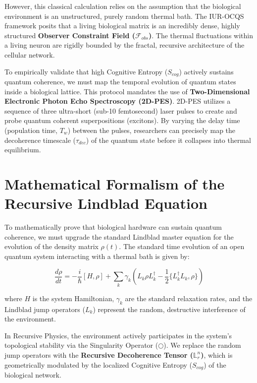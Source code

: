 \documentclass[12pt,openany]{book}
\begin{document}
However, this classical calculation relies on the assumption that the biological environment is an unstructured, purely random thermal bath. The IUR-OCQS framework posits that a living biological matrix is an incredibly dense, highly structured \textbf{Observer Constraint Field ($\mathcal{F}_{obs}$)}. The thermal fluctuations within a living neuron are rigidly bounded by the fractal, recursive architecture of the cellular network. 

To empirically validate that high Cognitive Entropy ($S_{cog}$) actively sustains quantum coherence, we must map the temporal evolution of quantum states inside a biological lattice. This protocol mandates the use of \textbf{Two-Dimensional Electronic Photon Echo Spectroscopy (2D-PES)}. 2D-PES utilizes a sequence of three ultra-short (sub-10 femtosecond) laser pulses to create and probe quantum coherent superpositions (excitons). By varying the delay time (population time, $T_w$) between the pulses, researchers can precisely map the decoherence timescale ($\tau_{dec}$) of the quantum state before it collapses into thermal equilibrium.

\section{Mathematical Formalism of the Recursive Lindblad Equation}
To mathematically prove that biological hardware can sustain quantum coherence, we must upgrade the standard Lindblad master equation for the evolution of the density matrix $\rho(t)$. The standard time evolution of an open quantum system interacting with a thermal bath is given by:

\begin{equation}
\frac{d\rho}{dt} = -\frac{i}{\hbar}[H, \rho] + \sum_k \gamma_k \left( L_k \rho L_k^\dagger - \frac{1}{2} \{L_k^\dagger L_k, \rho\} \right)
\end{equation}

where $H$ is the system Hamiltonian, $\gamma_k$ are the standard relaxation rates, and the Lindblad jump operators ($L_k$) represent the random, destructive interference of the environment.

In Recursive Physics, the environment actively participates in the system's topological stability via the Singularity Operator ($\bigcirc$). We replace the random jump operators with the \textbf{Recursive Decoherence Tensor ($\mathbb{L}_r^n$)}, which is geometrically modulated by the localized Cognitive Entropy ($S_{cog}$) of the biological network. 
\end{document}
